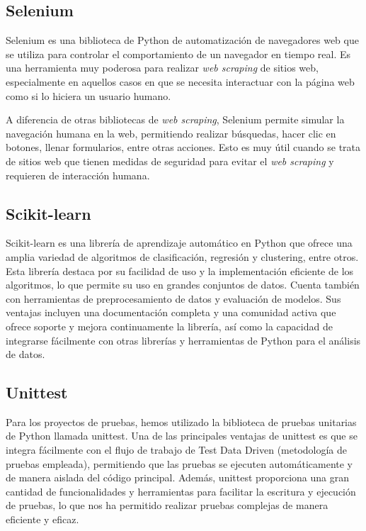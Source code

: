 \subsection{Selenium}

Selenium es una biblioteca de Python de automatización de navegadores web que se utiliza para controlar el comportamiento de un navegador en tiempo real. Es una herramienta muy poderosa para realizar \textit{web scraping} de sitios web, especialmente en aquellos casos en que se necesita interactuar con la página web como si lo hiciera un usuario humano.

A diferencia de otras bibliotecas de \textit{web scraping}, Selenium permite simular la navegación humana en la web, permitiendo realizar búsquedas, hacer clic en botones, llenar formularios, entre otras acciones. Esto es muy útil cuando se trata de sitios web que tienen medidas de seguridad para evitar el \textit{web scraping} y requieren de interacción humana.

\subsection{Scikit-learn}

Scikit-learn es una librería de aprendizaje automático en Python que ofrece una amplia variedad de algoritmos de clasificación, regresión y clustering, entre otros. Esta librería destaca por su facilidad de uso y la implementación eficiente de los algoritmos, lo que permite su uso en grandes conjuntos de datos. Cuenta también con herramientas de preprocesamiento de datos y evaluación de modelos. Sus ventajas incluyen una documentación completa y una comunidad activa que ofrece soporte y mejora continuamente la librería, así como la capacidad de integrarse fácilmente con otras librerías y herramientas de Python para el análisis de datos.

\subsection{Unittest}

Para los proyectos de pruebas, hemos utilizado la biblioteca de pruebas unitarias de Python llamada unittest. Una de las principales ventajas de unittest es que se integra fácilmente con el flujo de trabajo de Test Data Driven (metodología de pruebas empleada), permitiendo que las pruebas se ejecuten automáticamente y de manera aislada del código principal. Además, unittest proporciona una gran cantidad de funcionalidades y herramientas para facilitar la escritura y ejecución de pruebas, lo que nos ha permitido realizar pruebas complejas de manera eficiente y eficaz.

